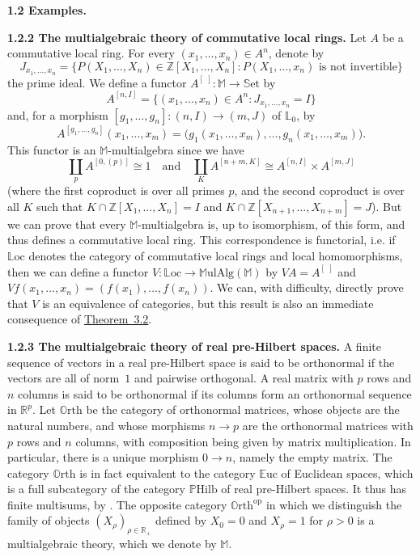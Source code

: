 \documentclass{article}
\newenvironment{rmenv}[1]
  {\phantomsection\par\medskip\noindent\textbf{#1.}\rmfamily}
  {\medskip}
\newcommand{\bb}[1]{{\mathbb{#1}}}
\newcommand{\op}{{\mathrm{op}}}
\newcommand{\Set}{\mathbb{S}\mathrm{et}}
\newcommand{\MulAlg}{\mathbb{M}\mathrm{ulAlg}}
\newcommand{\Loc}{\mathbb{L}\mathrm{oc}}
\newcommand{\Orth}{\mathbb{O}\mathrm{rth}}
\newcommand{\Euc}{\mathbb{E}\mathrm{uc}}
\newcommand{\PHilb}{\mathbb{P}\mathrm{Hilb}}
\newcommand{\oldpage}[1]{\marginpar{\footnotesize$\Big\vert$ \textit{p.~#1}}}
\begin{document}
\begin{rmenv}{1.2 Examples}
\begin{rmenv}{1.2.2 The multialgebraic theory of commutative local rings}
    Let $A$ be a commutative local ring.
    For every $(x_1,\ldots,x_n)\in A^n$, denote by
    \[
      J_{x_1,\ldots,x_n} =
      \big\{
        P(X_1,\ldots,X_n)\in\bb{Z}[X_1,\ldots,X_n]
        :
        \mbox{$P(X_1,\ldots,x_n)$ is not invertible}
      \big\}
    \]
\oldpage{196}
    the prime ideal.
    We define a functor  $A^{[\,\,]}\colon\bb{M}\to\Set$ by
    \[
      A^{[n,I]}=\{(x_1,\ldots,x_n)\in A^n:J_{x_1,\ldots,x_n}=I\}
    \]
    and, for a morphism $[g_1,\ldots,g_n]\colon(n,I)\to(m,J)$ of $\bb{L}_0$, by
    \[
      A^{[g_1,\ldots,g_n]}(x_1,\ldots,x_m) =
      \big(
        g_1(x_1,\ldots,x_m),
        \ldots,
        g_n(x_1,\ldots,x_m)
      \big).
    \]
    This functor is an $\bb{M}$-multialgebra since we have
    \[
      \coprod_p A^{[0,(p)]} \cong 1
      \quad\text{and}\quad
      \coprod_K A^{[n+m,K]} \cong A^{[n,I]}\times A^{[m,J]}
    \]
    (where the first coproduct is over all primes $p$, and the second coproduct is over all $K$ such that $K\cap\bb{Z}[X_1,\ldots,X_n] = I$ and $K\cap\bb{Z}[X_{n+1},\ldots,X_{n+m}] = J$).
    But we can prove that every $\bb{M}$-multialgebra is, up to isomorphism, of this form, and thus defines a commutative local ring.
    This correspondence is functorial, i.e. if $\Loc$ denotes the category of commutative local rings and local homomorphisms, then we can define a functor $V\colon\Loc\to\MulAlg(\bb{M})$ by $VA=A^{[\,\,]}$ and $Vf(x_1,\ldots,x_n)=(f(x_1),\ldots,f(x_n))$.
    We can, with difficulty, directly prove that $V$ is an equivalence of categories, but this result is also an immediate consequence of \hyperref[3.2]{Theorem~3.2}.
  \end{rmenv}

  \begin{rmenv}{1.2.3 The multialgebraic theory of real pre-Hilbert spaces}
  \label{1.2.3}
    A finite sequence of vectors in a real pre-Hilbert space is said to be orthonormal if the vectors are all of norm~$1$ and pairwise orthogonal.
    A real matrix with $p$ rows and $n$ columns is said to be orthonormal if its columns form an orthonormal sequence in $\bb{R}^p$.
    Let $\Orth$ be the category of orthonormal matrices, whose objects are the natural numbers, and whose morphisms $n\to p$ are the orthonormal matrices with $p$ rows and $n$ columns, with composition being given by matrix multiplication.
    In particular, there is a unique morphism $0\to n$, namely the empty matrix.
    The category $\Orth$ is in fact equivalent to the category $\Euc$ of Euclidean spaces, which is a full subcategory of the category $\PHilb$ of real pre-Hilbert spaces.
    It thus has finite multisums, by \cite[{}1.1.3]{2}.
    The opposite category $\Orth^\op$ in which we distinguish the family of objects $(X_\rho)_{\rho\in\bb{R}_+}$ defined by $X_0=0$ and $X_\rho=1$ for $\rho>0$ is a multialgebraic theory, which we denote by $\bb{M}$.


\end{rmenv}
\end{rmenv}
\end{document}
